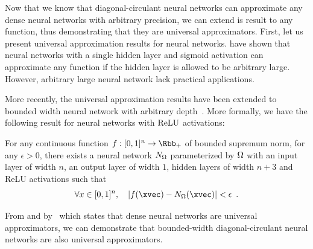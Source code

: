 


Now that we know that diagonal-circulant neural networks can approximate any dense neural networks with arbitrary precision, we can extend is result to any function, thus demonstrating that they are universal approximators.
First, let us present universal approximation results for neural networks.
\citet{cybenko1989approximation,hornik1989multilayer} have shown that neural networks with a single hidden layer and sigmoid activation can approximate any function if the hidden layer is allowed to be arbitrary large. 
However, arbitrary large neural network lack practical applications.

More recently, the universal approximation results have been extended to bounded width neural network with arbitrary depth~\cite{lu2017expressive,hanin2017universal}.
More formally, we have the following result for neural networks with $\mathrm{ReLU}$ activations:


\begin{theorem}
  \label{theorem:ch3-universal_approximation_theorem_for_neural_network}
  For any continuous function $f:[0,1]^{n} \rightarrow \Rbb_+$ of bounded supremum norm, for any $\epsilon>0$, there exists a neural network $N_\Omega$ parameterized by $\Omega$ with an input layer of width $n$, an output layer of width $1$, hidden layers of width $n+3$ and ReLU activations such that 
  \begin{equation}
    \forall x \in [0,1]^n, \quad \left| f(\xvec) - \nn_\weights(\xvec) \right| < \epsilon \enspace.
  \end{equation}
  \removespace
\end{theorem}

From  and  by~\citet{hanin2017universal} which states that dense neural networks are universal approximators, we can demonstrate that bounded-width diagonal-circulant neural networks are also universal approximators.


